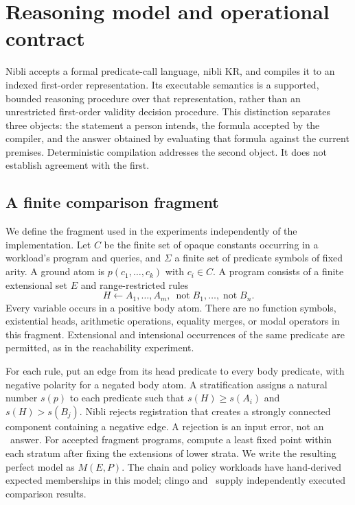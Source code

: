 \section{Reasoning model and operational contract}
\label{sec:semantics}

Nibli accepts a formal predicate-call language, nibli KR, and compiles it to an
indexed first-order representation. Its executable semantics is a supported,
bounded reasoning procedure over that representation, rather than an unrestricted
first-order validity decision procedure. This distinction separates three objects:
the statement a person intends, the formula accepted by the compiler, and the
answer obtained by evaluating that formula against the current premises.
Deterministic compilation addresses the second object. It does not establish
agreement with the first.

\subsection{A finite comparison fragment}

We define the fragment used in the experiments independently of the implementation.
Let $C$ be the finite set of opaque constants occurring in a workload's program
and queries, and $\Sigma$ a finite set of predicate symbols of fixed arity.
A ground atom is $p(c_1,\ldots,c_k)$ with $c_i\in C$.
A program consists of a finite extensional set $E$ and range-restricted rules
\begin{equation}
 H \leftarrow A_1,\ldots,A_m,\ \mathop{\mathrm{not}} B_1,\ldots,
 \mathop{\mathrm{not}} B_n .
 \label{eq:rule}
\end{equation}
Every variable occurs in a positive body atom. There are no function symbols,
existential heads, arithmetic operations, equality merges, or modal operators in
this fragment. Extensional and intensional occurrences of the same predicate
are permitted, as in the reachability experiment.

For each rule, put an edge from its head predicate to every body predicate, with
negative polarity for a negated body atom. A stratification assigns a natural
number $s(p)$ to each predicate such that $s(H)\geq s(A_i)$ and $s(H)>s(B_j)$.
Nibli rejects registration that creates a strongly connected component containing
a negative edge. A rejection is an input error, not an \Unknown\ answer.
For accepted fragment programs, compute a least fixed point within each stratum
after fixing the extensions of lower strata. We write the resulting perfect
model as $M(E,P)$. The chain and policy workloads have hand-derived expected
memberships in this model; clingo and \Souffle\ supply independently executed
comparison results.

